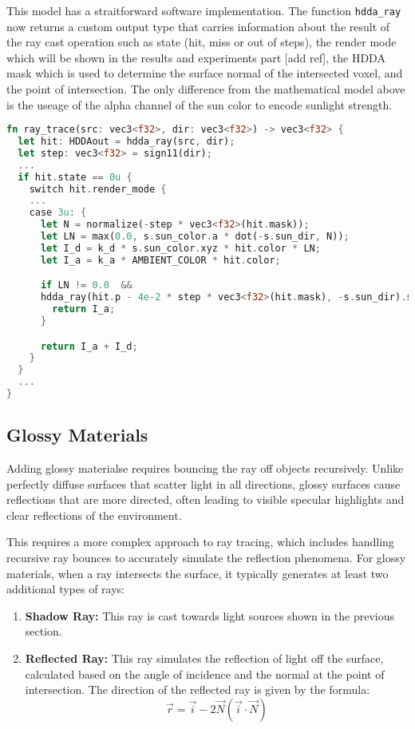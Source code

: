 This model has a straitforward software implementation. The function \texttt{hdda\_ray} now returns a custom output type that carries information
about the result of the ray cast operation such as state (hit, miss or out of steps), the render mode which will be shown in the results and experiments part [add ref],
the HDDA mask which is used to determine the surface normal of the intersected voxel, and the point of intersection.
The only difference from the mathematical model above is the useage of the alpha channel of the sun color to encode sunlight strength.

\begin{lstlisting}[language=rust,caption={Sunlight rendering on diffuse materials}, captionpos=b]
fn ray_trace(src: vec3<f32>, dir: vec3<f32>) -> vec3<f32> {
  let hit: HDDAout = hdda_ray(src, dir);
  let step: vec3<f32> = sign11(dir);
  ...
  if hit.state == 0u {
    switch hit.render_mode {
    ...
    case 3u: {
      let N = normalize(-step * vec3<f32>(hit.mask));
      let LN = max(0.0, s.sun_color.a * dot(-s.sun_dir, N));
      let I_d = k_d * s.sun_color.xyz * hit.color * LN;
      let I_a = k_a * AMBIENT_COLOR * hit.color;

      if LN != 0.0  &&
      hdda_ray(hit.p - 4e-2 * step * vec3<f32>(hit.mask), -s.sun_dir).state == 0u {
        return I_a;
      }

      return I_a + I_d;
    }
  }
  ...
}
\end{lstlisting}

\subsection{Glossy Materials}
Adding glossy materialse requires bouncing the ray off objects recursively. Unlike perfectly diffuse surfaces that scatter light in all directions, glossy surfaces cause reflections that are more directed, often leading to visible specular highlights and clear reflections of the environment.

This requires a more complex approach to ray tracing, which includes handling recursive ray bounces to accurately simulate the reflection phenomena.
For glossy materials, when a ray intersects the surface, it typically generates at least two additional types of rays:
\begin{enumerate}
  \item \textbf{Shadow Ray:} This ray is cast towards light sources shown in the previous section.
  \item \textbf{Reflected Ray:} This ray simulates the reflection of light off the surface, calculated based on the angle of incidence and the normal at the point of intersection.
        The direction of the reflected ray is given by the formula:
        \begin{equation}
          \vec r = \vec i - 2\vec N(\vec i \cdot \vec N)
        \end{equation}
\end{enumerate}

